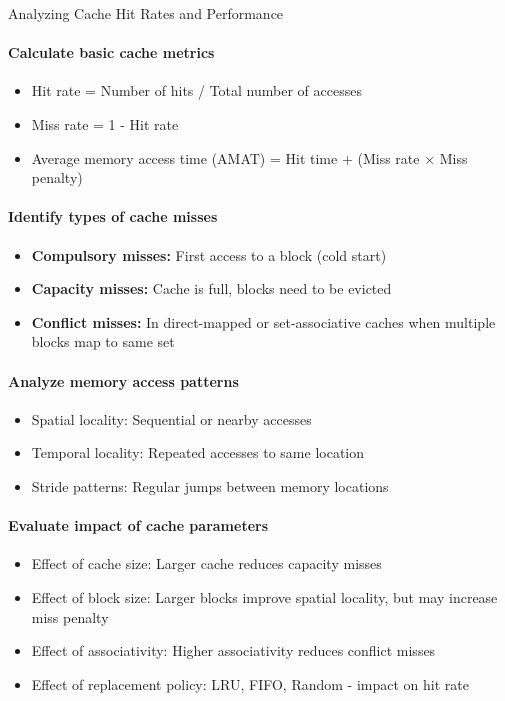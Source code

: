 \begin{KR}{Analyzing Cache Hit Rates and Performance}
\paragraph{Calculate basic cache metrics}
\begin{itemize}
    \item Hit rate = Number of hits / Total number of accesses
    \item Miss rate = 1 - Hit rate
    \item Average memory access time (AMAT) = Hit time + (Miss rate × Miss penalty)
\end{itemize}

\paragraph{Identify types of cache misses}
\begin{itemize}
    \item \textbf{Compulsory misses:} First access to a block (cold start)
    \item \textbf{Capacity misses:} Cache is full, blocks need to be evicted
    \item \textbf{Conflict misses:} In direct-mapped or set-associative caches when multiple blocks map to same set
\end{itemize}

\paragraph{Analyze memory access patterns}
\begin{itemize}
    \item Spatial locality: Sequential or nearby accesses
    \item Temporal locality: Repeated accesses to same location
    \item Stride patterns: Regular jumps between memory locations
\end{itemize}

\paragraph{Evaluate impact of cache parameters}
\begin{itemize}
    \item Effect of cache size: Larger cache reduces capacity misses
    \item Effect of block size: Larger blocks improve spatial locality, but may increase miss penalty
    \item Effect of associativity: Higher associativity reduces conflict misses
    \item Effect of replacement policy: LRU, FIFO, Random - impact on hit rate
\end{itemize}
\end{KR}

